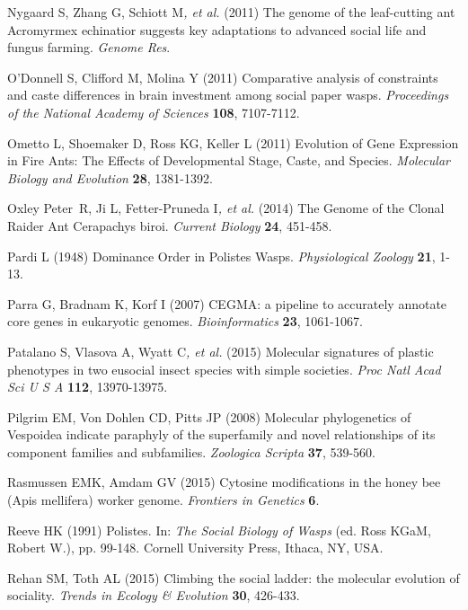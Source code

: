 \documentclass[]{article}
\begin{document}
\protect\hypertarget{ux5fENREFux5f37}{}{}Nygaard S, Zhang G, Schiott
M\emph{, et al.} (2011) The genome of the leaf-cutting ant Acromyrmex
echinatior suggests key adaptations to advanced social life and fungus
farming. \emph{Genome Res}.

\protect\hypertarget{ux5fENREFux5f38}{}{}O'Donnell S, Clifford M, Molina
Y (2011) Comparative analysis of constraints and caste differences in
brain investment among social paper wasps. \emph{Proceedings of the
National Academy of Sciences} \textbf{108}, 7107-7112.

\protect\hypertarget{ux5fENREFux5f39}{}{}Ometto L, Shoemaker D, Ross KG,
Keller L (2011) Evolution of Gene Expression in Fire Ants: The Effects
of Developmental Stage, Caste, and Species. \emph{Molecular Biology and
Evolution} \textbf{28}, 1381-1392.

\protect\hypertarget{ux5fENREFux5f40}{}{}Oxley Peter~R, Ji L,
Fetter-Pruneda I\emph{, et al.} (2014) The Genome of the Clonal Raider
Ant Cerapachys biroi. \emph{Current Biology} \textbf{24}, 451-458.

\protect\hypertarget{ux5fENREFux5f41}{}{}Pardi L (1948) Dominance Order
in Polistes Wasps. \emph{Physiological Zoology} \textbf{21}, 1-13.

\protect\hypertarget{ux5fENREFux5f42}{}{}Parra G, Bradnam K, Korf I
(2007) CEGMA: a pipeline to accurately annotate core genes in eukaryotic
genomes. \emph{Bioinformatics} \textbf{23}, 1061-1067.

\protect\hypertarget{ux5fENREFux5f43}{}{}Patalano S, Vlasova A, Wyatt
C\emph{, et al.} (2015) Molecular signatures of plastic phenotypes in
two eusocial insect species with simple societies. \emph{Proc Natl Acad
Sci U S A} \textbf{112}, 13970-13975.

\protect\hypertarget{ux5fENREFux5f44}{}{}Pilgrim EM, Von Dohlen CD,
Pitts JP (2008) Molecular phylogenetics of Vespoidea indicate paraphyly
of the superfamily and novel relationships of its component families and
subfamilies. \emph{Zoologica Scripta} \textbf{37}, 539-560.

\protect\hypertarget{ux5fENREFux5f45}{}{}Rasmussen EMK, Amdam GV (2015)
Cytosine modifications in the honey bee (Apis mellifera) worker genome.
\emph{Frontiers in Genetics} \textbf{6}.

\protect\hypertarget{ux5fENREFux5f46}{}{}Reeve HK (1991) Polistes. In:
\emph{The Social Biology of Wasps} (ed. Ross KGaM, Robert W.), pp.
99-148. Cornell University Press, Ithaca, NY, USA.

\protect\hypertarget{ux5fENREFux5f47}{}{}Rehan SM, Toth AL (2015)
Climbing the social ladder: the molecular evolution of sociality.
\emph{Trends in Ecology \& Evolution} \textbf{30}, 426-433.
\end{document}
